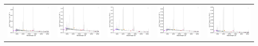 \begin{center}
\begin{longtable}{l l l l l }
    \includegraphics[width=0.2\linewidth, clip]{Figs/Figs-sdss/spec-0378-52146-0223-STRIPE82-0145-047131.pdf} & \includegraphics[width=0.2\linewidth, clip]{Figs/Figs-sdss/spec-0389-51795-0544-STRIPE82-0008-021736.pdf} & \includegraphics[width=0.2\linewidth, clip]{Figs/Figs-sdss/spec-0390-51900-0596-STRIPE82-0010-026778.pdf} & \includegraphics[width=0.2\linewidth, clip]{Figs/Figs-sdss/spec-0391-51782-0125-STRIPE82-0011-016278.pdf} & \includegraphics[width=0.2\linewidth, clip]{Figs/Figs-sdss/spec-0391-51782-0394-STRIPE82-0010-016724.pdf} \\

\end{longtable}
\end{center}
